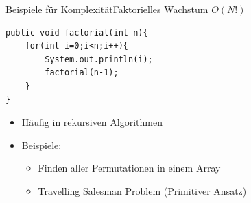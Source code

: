 \begin{frame}[fragile]{Beispiele für Komplexität}{Faktorielles Wachstum $O(N!)$}
\lstset{style=java}
\begin{lstlisting}
public void factorial(int n){
    for(int i=0;i<n;i++){
        System.out.println(i);
        factorial(n-1);
    }
}
\end{lstlisting}
\begin{itemize}
    \item Häufig in rekursiven Algorithmen
    \item Beispiele:
    \begin{itemize}
        \item Finden aller Permutationen in einem Array
        \item Travelling Salesman Problem (Primitiver Ansatz)
    \end{itemize}
\end{itemize}
\end{frame}